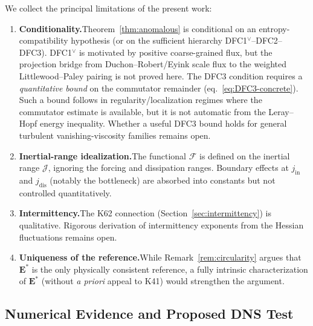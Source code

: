 \documentclass[12pt,a4paper]{article}
\theoremstyle{breakdef}
\theoremstyle{breakplain}
\theoremstyle{breakdef}
\begin{document}
We collect the principal limitations of the present work:
\begin{enumerate}
\item \textbf{Conditionality.}\quad Theorem~\ref{thm:anomalous} is conditional
  on an entropy-compatibility hypothesis (or on the sufficient hierarchy
  DFC1$^\vee$--DFC2--DFC3). DFC1$^\vee$ is motivated by positive
  coarse-grained flux, but the projection bridge from
  Duchon--Robert/Eyink scale flux to the weighted Littlewood--Paley pairing
  is not proved here. The DFC3 condition requires a \emph{quantitative bound}
  on the commutator remainder (eq.~\eqref{eq:DFC3-concrete}). Such a bound
  follows in regularity/localization regimes where the commutator estimate
  is available, but it is not automatic from the Leray--Hopf energy
  inequality. Whether a useful DFC3 bound holds for general turbulent
  vanishing-viscosity families remains open.
\item \textbf{Inertial-range idealization.}\quad The functional $\mathcal{F}$
  is defined on the inertial range $\mathcal{J}$, ignoring the forcing
  and dissipation ranges.  Boundary effects at $j_{\mathrm{in}}$ and
  $j_{\mathrm{dis}}$ (notably the bottleneck) are absorbed into constants
  but not controlled quantitatively.
\item \textbf{Intermittency.}\quad The K62 connection (Section~\ref{sec:intermittency})
  is qualitative.  Rigorous derivation of intermittency exponents from
  the Hessian fluctuations remains open.
\item \textbf{Uniqueness of the reference.}\quad While Remark~\ref{rem:circularity}
  argues that $\mathbf{E}^*$ is the only physically consistent reference,
  a fully intrinsic characterization of $\mathbf{E}^*$ (without
  \emph{a priori} appeal to K41) would strengthen the argument.
\end{enumerate}

\subsection{Numerical Evidence and Proposed DNS Test}
\end{document}
